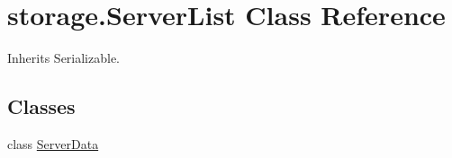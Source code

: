 \hypertarget{classstorage_1_1_server_list}{
\section{storage.\-Server\-List \-Class \-Reference}
\label{classstorage_1_1_server_list}
}


\-Inherits \-Serializable.

\subsection*{\-Classes}
\begin{DoxyCompactItemize}
\item 
class \hyperlink{classstorage_1_1_server_list_1_1_server_data}{\-Server\-Data}
\end{DoxyCompactItemize}
